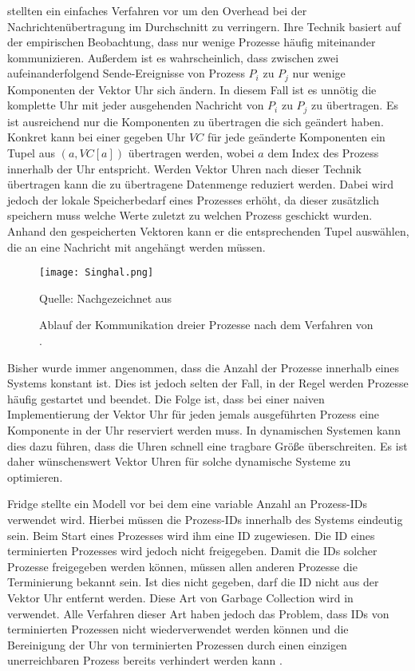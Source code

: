  \cite{singhal1992efficient} stellten ein einfaches Verfahren vor um den Overhead bei der Nachrichtenübertragung im Durchschnitt zu verringern.
Ihre Technik basiert auf der empirischen Beobachtung, dass nur wenige Prozesse häufig miteinander kommunizieren.
Außerdem ist es wahrscheinlich, dass zwischen zwei aufeinanderfolgend Sende-Ereignisse von Prozess $P_i$ zu $P_j$ nur wenige Komponenten der Vektor Uhr sich ändern.
In diesem Fall ist es unnötig die komplette Uhr mit jeder ausgehenden Nachricht von $P_i$ zu $P_j$ zu übertragen.
Es ist ausreichend nur die Komponenten zu übertragen die sich geändert haben.
Konkret kann bei einer gegeben Uhr $VC$ für jede geänderte Komponenten ein Tupel aus $(a, VC[a])$ übertragen werden, wobei $a$ dem Index des Prozess innerhalb der Uhr entspricht.
Werden Vektor Uhren nach dieser Technik übertragen kann die zu übertragene Datenmenge reduziert werden.
Dabei wird jedoch der lokale Speicherbedarf eines Prozesses erhöht, da dieser zusätzlich speichern muss welche Werte zuletzt zu welchen Prozess geschickt wurden.
Anhand den gespeicherten Vektoren kann er die entsprechenden Tupel auswählen, die an eine Nachricht mit angehängt werden müssen.

\begin{figure}[ht]
    \centering
    \texttt{[image: Singhal.png]}
    \caption[Kommunikaiton nach Singhal]{Ablauf der Kommunikation dreier Prozesse nach dem Verfahren von .}
    Quelle: Nachgezeichnet aus \cite{Baldoni:2002:FDC:1435723.1437765}
    \label{fig:singhal}
\end{figure}

Bisher wurde immer angenommen, dass die Anzahl der Prozesse innerhalb eines Systems konstant ist.
Dies ist jedoch selten der Fall, in der Regel werden Prozesse häufig gestartet und beendet.
Die Folge ist, dass bei einer naiven Implementierung der Vektor Uhr für jeden jemals ausgeführten Prozess eine Komponente in der Uhr reserviert werden muss.
In dynamischen Systemen kann dies dazu führen, dass die Uhren schnell eine tragbare Größe überschreiten.
Es ist daher wünschenswert Vektor Uhren für solche dynamische Systeme zu optimieren.

Fridge \cite{fidge1991logical} stellte ein Modell vor bei dem eine variable Anzahl an Prozess-IDs verwendet wird.
Hierbei müssen die Prozess-IDs innerhalb des Systems eindeutig sein.
Beim Start eines Prozesses wird ihm eine ID zugewiesen.
Die ID eines terminierten Prozesses wird jedoch nicht freigegeben.
Damit die IDs solcher Prozesse freigegeben werden können, müssen allen anderen Prozesse die Terminierung bekannt sein.
Ist dies nicht gegeben, darf die ID nicht aus der Vektor Uhr entfernt werden.
Diese Art von Garbage Collection wird in \cite{richard1998efficient} verwendet.
Alle Verfahren dieser Art haben jedoch das Problem, dass IDs von terminierten Prozessen nicht wiederverwendet werden können und die Bereinigung der Uhr von terminierten Prozessen durch einen einzigen unerreichbaren Prozess bereits verhindert werden kann \cite{almeida2008treeclocks}.


